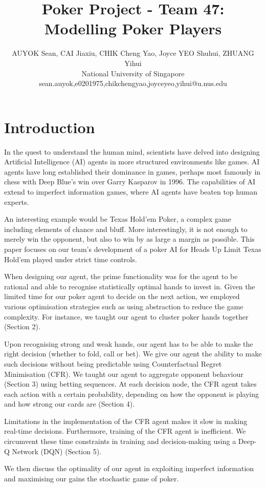 \documentclass{article}
\title{Poker Project - Team 47: Modelling Poker Players}
\author{
AUYOK Sean, CAI Jiaxiu, CHIK Cheng Yao, Joyce YEO Shuhui, ZHUANG Yihui
\\ 
National University of Singapore\\
sean.auyok,e0201975,chikchengyao,joyceyeo,yihui@u.nus.edu
}
\begin{document}
\maketitle

\section{Introduction}

In the quest to understand the human mind, scientists have delved into designing Artificial Intelligence (AI) agents in more structured environments like games. AI agents have long established their dominance in games, perhaps most famously in chess with Deep Blue's win over Garry Kasparov in 1996. The capabilities of AI extend to imperfect information games, where AI agents have beaten top human experts. 

An interesting example would be Texas Hold'em Poker, a complex game including elements of chance and bluff. More interestingly, it is not enough to merely win the opponent, but also to win by as large a margin as possible. This paper focuses on our team's development of a poker AI for Heads Up Limit Texas Hold'em played under strict time controls. 

When designing our agent, the prime functionality was for the agent to be rational and able to recognise statistically optimal hands to invest in. Given the limited time for our poker agent to decide on the next action, we employed various optimisation strategies such as using abstraction to reduce the game complexity. For instance, we taught our agent to cluster poker hands together (Section 2).

Upon recognising strong and weak hands, our agent has to be able to make the right decision (whether to fold, call or bet). We give our agent the ability to make such decisions without being predictable using Counterfactual Regret Minimisation (CFR). We taught our agent to aggregate opponent behaviour (Section 3) using betting sequences. At each decision node, the CFR agent takes each action with a certain probability, depending on how the opponent is playing and how strong our cards are (Section 4).

Limitations in the implementation of the CFR agent makes it slow in making real-time decisions. Furthermore, training of the CFR agent is inefficient. We circumvent these time constraints in training and decision-making using a Deep-Q Network (DQN) (Section 5). 

We then discuss the optimality of our agent in exploiting imperfect information and maximising our gains the stochastic game of poker.
\end{document}
